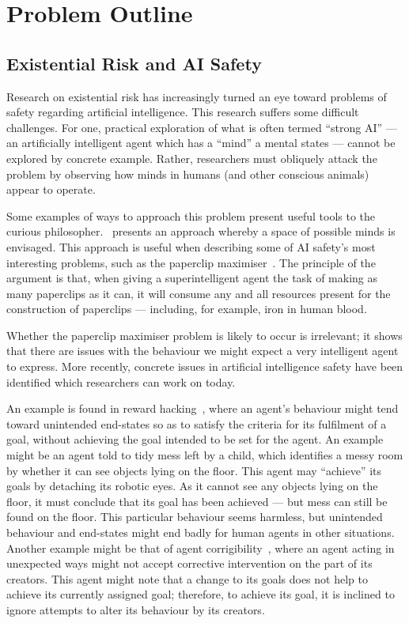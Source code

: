 \section{Problem Outline}
\subsection{Existential Risk and AI Safety}
Research on existential risk has increasingly turned an eye toward problems of safety regarding artificial intelligence. This research suffers some difficult challenges. For one, practical exploration of what is often termed ``strong AI'' --- an artificially intelligent agent which has a ``mind'' a mental states --- cannot be explored by concrete example. Rather, researchers must obliquely attack the problem by observing how minds in humans (and other conscious animals) appear to operate.\par

Some examples of ways to approach this problem present useful tools to the curious philosopher.~\cite{Sloman1984TheMinds} presents an approach whereby a space of possible minds is envisaged. This approach is useful when describing some of AI safety's most interesting problems, such as the paperclip maximiser~\citep{bostrom2003ethical}. The principle of the argument is that, when giving a superintelligent agent the task of making as many paperclips as it can, it will consume any and all resources present for the construction of paperclips --- including, for example, iron in human blood.\par

Whether the paperclip maximiser problem is likely to occur is irrelevant; it shows that there are issues with the behaviour we might expect a very intelligent agent to express. More recently, concrete issues in artificial intelligence safety have been identified which researchers can work on today. \par

An example is found in reward hacking~\citep{concrete_problems}, where an agent's behaviour might tend toward unintended end-states so as to satisfy the criteria for its fulfilment of a goal, without achieving the goal intended to be set for the agent. An example might be an agent told to tidy mess left by a child, which identifies a messy room by whether it can see objects lying on the floor. This agent may ``achieve'' its goals by detaching its robotic eyes. As it cannot see any objects lying on the floor, it must conclude that its goal has been achieved --- but mess can still be found on the floor. This particular behaviour seems harmless, but unintended behaviour and end-states might end badly for human agents in other situations. Another example might be that of agent corrigibility~\citep{corrigibility}, where an agent acting in unexpected ways might not accept corrective intervention on the part of its creators. This agent might note that a change to its goals does not help to achieve its currently assigned goal; therefore, to achieve its goal, it is inclined to ignore attempts to alter its behaviour by its creators.\par

